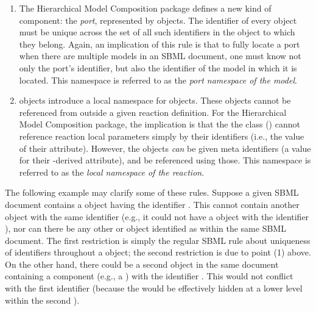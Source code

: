 \begin{enumerate}
\item The Hierarchical Model Composition package defines a new kind of
  component: the \emph{port}, represented by \Port objects.  The
  identifier of every \Port object must be unique across the set of all
  such identifiers in the \Model object to which they belong.  Again, an
  implication of this rule is that to fully locate a port when there are
  multiple models in an SBML document, one must know not only the port's
  identifier, but also the identifier of the model in which it is
  located.  This namespace is referred to as the 
  \emph{port namespace of the model}.

\item \Reaction objects introduce a local namespace for \LocalParameter
  objects.  These objects cannot be referenced from outside a given
  reaction definition.  For the Hierarchical Model Composition package,
  the implication is that the the \SBaseRef class
  () cannot reference reaction local parameters
  simply by their identifiers (i.e., the value of their 
  attribute).  However, the \LocalParameter objects \emph{can} be given
  meta identifiers (a value for their \SBase-derived 
  attribute), and be referenced using those.  This namespace is
  referred to as the \emph{local namespace of the reaction}.

% 


\end{enumerate}

The following example may clarify some of these rules.  Suppose a given
SBML document contains a \Model object having the identifier .
This \Model cannot contain another object with the same identifier
(e.g., it could not have a \Parameter object with the identifier
), nor can there be any other \Model or
\ExternalModelDefinition object identified as  within the
same SBML document.  The first restriction is simply the regular SBML
rule about uniqueness of identifiers throughout a \Model object; the
second restriction is due to point (1) above.  On the other hand, there
could be a second \Model object in the same document containing a
component (e.g., a \Parameter) with the identifier .  This
would not conflict with the first \Model identifier (because the
\Parameter would be effectively hidden at a lower level within the
second \Model).


